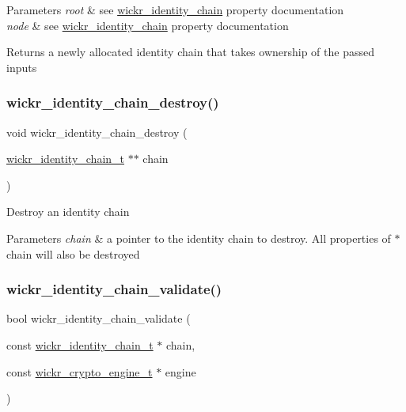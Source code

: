 \begin{DoxyParams}{Parameters}
{\em root} & see \textquotesingle{}\mbox{\hyperlink{structwickr__identity__chain}{wickr\+\_\+identity\+\_\+chain}}\textquotesingle{} property documentation \\
\hline
{\em node} & see \textquotesingle{}\mbox{\hyperlink{structwickr__identity__chain}{wickr\+\_\+identity\+\_\+chain}}\textquotesingle{} property documentation \\
\hline
\end{DoxyParams}
\begin{DoxyReturn}{Returns}
a newly allocated identity chain that takes ownership of the passed inputs 
\end{DoxyReturn}
\mbox{\label{group__wickr__identity_gadbddf6d49fddb2df103486970b3d564b}} 
\subsubsection{\texorpdfstring{wickr\_identity\_chain\_destroy()}{wickr\_identity\_chain\_destroy()}}
{\footnotesize\ttfamily void wickr\+\_\+identity\+\_\+chain\+\_\+destroy (\begin{DoxyParamCaption}\item[{\mbox{\hyperlink{structwickr__identity__chain}{wickr\+\_\+identity\+\_\+chain\+\_\+t}} $\ast$$\ast$}]{chain }\end{DoxyParamCaption})}

Destroy an identity chain


\begin{DoxyParams}{Parameters}
{\em chain} & a pointer to the identity chain to destroy. All properties of \textquotesingle{}$\ast$chain\textquotesingle{} will also be destroyed \\
\hline
\end{DoxyParams}
\mbox{\label{group__wickr__identity_ga12f5b33c4947b6a2ca3df3bdaacafa10}} 
\subsubsection{\texorpdfstring{wickr\_identity\_chain\_validate()}{wickr\_identity\_chain\_validate()}}
{\footnotesize\ttfamily bool wickr\+\_\+identity\+\_\+chain\+\_\+validate (\begin{DoxyParamCaption}\item[{const \mbox{\hyperlink{structwickr__identity__chain}{wickr\+\_\+identity\+\_\+chain\+\_\+t}} $\ast$}]{chain,  }\item[{const \mbox{\hyperlink{structwickr__crypto__engine}{wickr\+\_\+crypto\+\_\+engine\+\_\+t}} $\ast$}]{engine }\end{DoxyParamCaption})}


